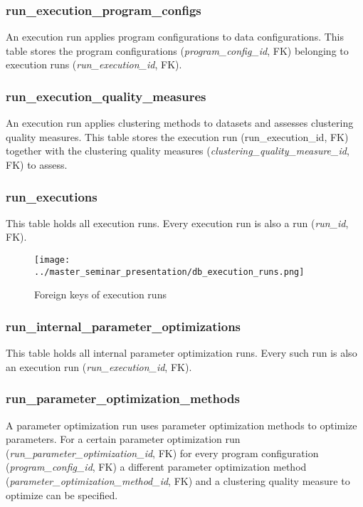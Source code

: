 	\subsubsection{run\_execution\_program\_configs}
	An execution run applies program configurations to data configurations. This table stores the program configurations (\textit{program\_config\_id}, FK) belonging to execution runs (\textit{run\_execution\_id}, FK).
	
	\subsubsection{run\_execution\_quality\_measures}
	An execution run applies clustering methods to datasets and assesses clustering quality measures. This table stores the execution run (run\_execution\_id, FK) together with the clustering quality measures (\textit{clustering\_quality\_measure\_id}, FK) to assess.
	
	\subsubsection{run\_executions}
	This table holds all execution runs. Every execution run is also a run (\textit{run\_id}, FK).

\begin{figure}[hbtp]
\caption{Foreign keys of execution runs}
\label{fig_execution_runs_foreign_keys}
\centering
\texttt{[image: ../master\_seminar\_presentation/db\_execution\_runs.png]}
\end{figure} 
	
	\subsubsection{run\_internal\_parameter\_optimizations}
	This table holds all internal parameter optimization runs. Every such run is also an execution run (\textit{run\_execution\_id}, FK).
	
	\subsubsection{run\_parameter\_optimization\_methods}
	A parameter optimization run uses parameter optimization methods to optimize parameters. For a certain parameter optimization run (\textit{run\_parameter\_optimization\_id}, FK) for every program configuration (\textit{program\_config\_id}, FK) a different parameter optimization method (\textit{parameter\_optimization\_method\_id}, FK) and a clustering quality measure to optimize can be specified.
	
